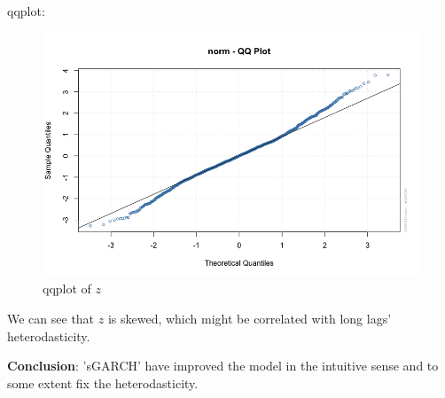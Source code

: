 \documentclass[a4paper, 11pt]{article}
\begin{document}
qqplot:
\begin{figure}[H]
\centering
\caption{qqplot of $z$}
\includegraphics[scale=.60]{qqplot.png}
\end{figure}

\indent We can see that $z$ is skewed, which might be correlated with long lags' heterodasticity.\par

\textbf{Conclusion}: 'sGARCH' have improved the model in the intuitive sense and to some extent fix the heterodasticity. 
\end{document}
